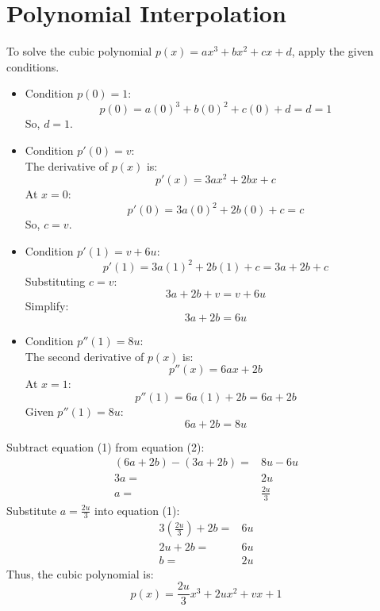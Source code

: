 \documentclass{article}
\begin{document}
\newpage
\section{Polynomial Interpolation}
To solve the cubic polynomial $p(x) = ax^3 + bx^2 + cx + d$, apply the given conditions.
\begin{itemize}
    \item Condition $ p(0) = 1 $:
          $$
              p(0) = a(0)^3 + b(0)^2 + c(0) + d = d = 1
          $$
          So, $ d = 1 $.
    \item Condition $ p'(0) = v $:\\
          The derivative of $ p(x) $ is:
          $$
              p'(x) = 3ax^2 + 2bx + c
          $$
          At $ x = 0 $:
          $$
              p'(0) = 3a(0)^2 + 2b(0) + c = c
          $$
          So, $ c = v $.
    \item Condition $ p'(1) = v + 6u $:
          $$
              p'(1) = 3a(1)^2 + 2b(1) + c = 3a + 2b + c
          $$
          Substituting $ c = v $:
          $$
              3a + 2b + v = v + 6u
          $$
          Simplify:
          \begin{equation*}
              3a + 2b = 6u \tag{1}
          \end{equation*}
    \item Condition $ p''(1) = 8u $:\\
          The second derivative of $ p(x) $ is:
          $$
              p''(x) = 6ax + 2b
          $$
          At $ x = 1 $:
          $$
              p''(1) = 6a(1) + 2b = 6a + 2b
          $$
          Given $ p''(1) = 8u $:
          \begin{equation*}
              6a + 2b = 8u \tag{2}
          \end{equation*}
\end{itemize}

Subtract equation (1) from equation (2):
$$
    \begin{aligned}
        (6a + 2b) - (3a + 2b) = & 8u - 6u      \\
        3a =                    & 2u           \\
        a =                     & \frac{2u}{3}
    \end{aligned}
$$
Substitute $ a = \frac{2u}{3} $ into equation (1):
$$
    \begin{aligned}
        3\left(\frac{2u}{3}\right) + 2b = & 6u \\
        2u + 2b =                         & 6u \\
        b =                               & 2u
    \end{aligned}
$$
Thus, the cubic polynomial is:
$$
    \boxed{p(x) = \frac{2u}{3}x^3 + 2ux^2 + vx + 1}
$$
\end{document}
